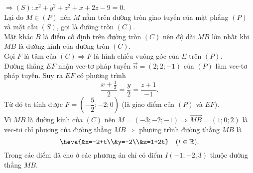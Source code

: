 \begin{ex}
{		$\Rightarrow (S)\colon x^2 + y^2 + z^2 + x + 2z - 9 = 0$.\\
		Lại do $M \in (P)$ nên $M$ nằm trên đường tròn giao tuyến của mặt phẳng $(P)$ và mặt cầu $(S)$, gọi là đường tròn $(C)$.\\
		Mặt khác $B$ là điểm cố định trên đường tròn $(C)$ nên độ dài $MB$ lớn nhất khi $MB$ là đường kính của đường tròn $(C)$.\\
		Gọi $F$ là tâm của $(C) \Rightarrow F$ là hình chiếu vuông góc của $E$ trên $(P)$.\\
		Đường thẳng $EF$ nhận vec-tơ pháp tuyến $\overrightarrow{n} = (2; 2; -1)$ của $(P)$ làm vec-tơ pháp tuyến. Suy ra $EF$ có phương trình
		$$ \dfrac{x + \frac{1}{2}}{2} = \dfrac{y}{2} = \dfrac{z + 1}{-1}.$$
		Từ đó ta tính được $F = \left( -\dfrac{5}{2}; -2; 0 \right)$ (là giao điểm của $(P)$ và $EF$).\\
		Vì $MB$ là đường kính của $(C)$ nên $M = (-3; -2; -1) \Rightarrow \overrightarrow{MB} = (1; 0; 2)$ là vec-tơ chỉ phương của đường thẳng $MB \Rightarrow$ phương trình đường thẳng $MB$ là 
		$$\heva{&x=-2+t\\&y=-2\\&z=1+2t} \quad (t \in \mathbb{R}).$$
		Trong các điểm đã cho ở các phương án chỉ có điểm $I (-1; -2; 3)$  thuộc đường thẳng $MB$.	
	}
\end{ex}

